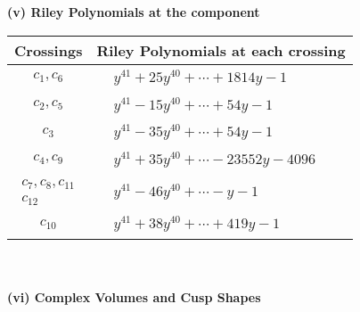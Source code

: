 \documentclass[1p]{elsarticle_modified}
\theoremstyle{definition}
\begin{document}
\newpage\renewcommand{\arraystretch}{1}
\flushleft \textbf{(v) Riley Polynomials at the component}\newline \\
\begin{tabular}{m{50pt}|m{274pt}}
Crossings & \hspace{64pt}Riley Polynomials at each crossing \\
\hline $$\begin{aligned}c_{1},c_{6}\end{aligned}$$&$\begin{aligned}
&y^{41}+25 y^{40}+\cdots+1814 y-1
\end{aligned}$\\
\hline $$\begin{aligned}c_{2},c_{5}\end{aligned}$$&$\begin{aligned}
&y^{41}-15 y^{40}+\cdots+54 y-1
\end{aligned}$\\
\hline $$\begin{aligned}c_{3}\end{aligned}$$&$\begin{aligned}
&y^{41}-35 y^{40}+\cdots+54 y-1
\end{aligned}$\\
\hline $$\begin{aligned}c_{4},c_{9}\end{aligned}$$&$\begin{aligned}
&y^{41}+35 y^{40}+\cdots-23552 y-4096
\end{aligned}$\\
\hline $$\begin{aligned}c_{7},c_{8},c_{11}\\c_{12}\end{aligned}$$&$\begin{aligned}
&y^{41}-46 y^{40}+\cdots- y-1
\end{aligned}$\\
\hline $$\begin{aligned}c_{10}\end{aligned}$$&$\begin{aligned}
&y^{41}+38 y^{40}+\cdots+419 y-1
\end{aligned}$\\
\hline
\end{tabular}\\~\\
\newpage\flushleft \textbf{(vi) Complex Volumes and Cusp Shapes}
\end{document}
